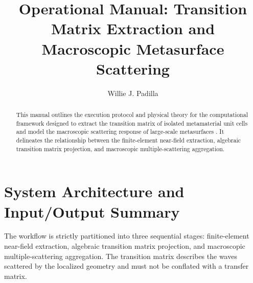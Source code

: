 \documentclass[11pt,a4paper]{article}
\title{Operational Manual: Transition Matrix Extraction and Macroscopic Metasurface Scattering}
\author{Willie J. Padilla}
\date{}
\begin{document}
\maketitle

\begin{abstract}
This manual outlines the execution protocol and physical theory for the computational framework designed to extract the transition matrix of isolated metamaterial unit cells and model the macroscopic scattering response of large-scale metasurfaces \cite{deng2021neural, malof2023forward}. It delineates the relationship between the finite-element near-field extraction, algebraic transition matrix projection, and macroscopic multiple-scattering aggregation.
\end{abstract}

\section{System Architecture and Input/Output Summary} \label{sec:architecture}
The workflow is strictly partitioned into three sequential stages: finite-element near-field extraction, algebraic transition matrix projection, and macroscopic multiple-scattering aggregation. The transition matrix describes the waves scattered by the localized geometry and must not be conflated with a transfer matrix.

\begin{table}[h]
\centering
\caption{Computational Stage I/O Summary}
\label{tab:io_summary}
\end{table}
\end{document}
